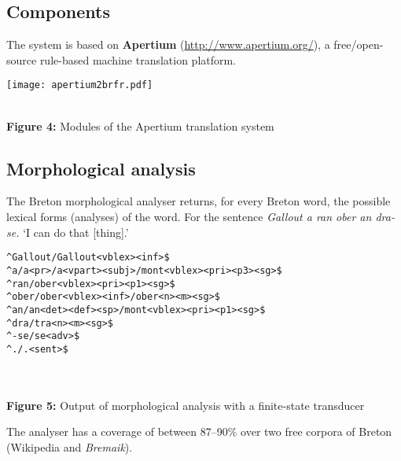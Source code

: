 \documentclass[a0,landscape]{a0poster}
\begin{document}
\begin{multicols}{4}
\vspace{1.5cm}
\section{Components}

\noindent
The system is based on {\bf Apertium} (\url{http://www.apertium.org/}), a free/open-source rule-based
machine translation platform.\\

\begin{center}
\begin{minipage}[b]{26cm}
\texttt{[image: apertium2brfr.pdf]}
\end{minipage}\\
\textbf{Figure 4:} Modules of the Apertium translation system
\vspace{0.3cm}
\end{center}

\subsection{Morphological analysis}

\noindent
The Breton morphological analyser returns, for every Breton word, the 
possible lexical forms (analyses) of the word. For the sentence \emph{Gallout a 
ran ober an dra-se.} `I can do that [thing].'\\

\begin{center}
\begin{minipage}[b]{25cm}
\begin{small}
\begin{verbatim}
^Gallout/Gallout<vblex><inf>$ 
^a/a<pr>/a<vpart><subj>/mont<vblex><pri><p3><sg>$ 
^ran/ober<vblex><pri><p1><sg>$ 
^ober/ober<vblex><inf>/ober<n><m><sg>$ 
^an/an<det><def><sp>/mont<vblex><pri><p1><sg>$ 
^dra/tra<n><m><sg>$ 
^-se/se<adv>$
^./.<sent>$
\end{verbatim}
\end{small}
\end{minipage}\\
~\\
\textbf{Figure 5:} Output of morphological analysis with a finite-state transducer
\vspace{0.5cm}
\end{center}
\vspace{0.5cm}

\noindent
The analyser has a coverage of between 87--90\% over two free corpora of Breton (Wikipedia and \emph{Bremaik}).


\end{multicols}
\end{document}
